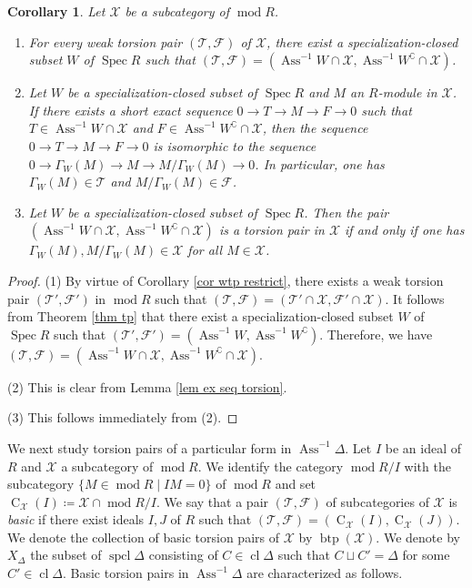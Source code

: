 \documentclass{amsart}
\newtheorem{cor}[thm]{Corollary}
\theoremstyle{definition}
\theoremstyle{remark}
\def\Ass{\operatorname{Ass}}
\def\btp{\operatorname{btp}}
\def\CC{\operatorname{C}}
\def\cl{\operatorname{cl}}
\def\F{\mathcal{F}}
\def\mod{\operatorname{mod}}
\def\spcl{\operatorname{spcl}}
\def\Spec{\operatorname{Spec}}
\def\T{\mathcal{T}}
\def\X{\mathcal{X}}
\begin{document}
\begin{cor}\label{cor cano seq}
Let $\X$ be a subcategory of $\mod R$.
\begin{enumerate}[\rm(1)]
\item
For every weak torsion pair $(\T,\F)$ of $\X$, there exist a specialization-closed subset $W$ of $\Spec R$ such that $(\T,\F)=(\Ass^{-1}W\cap\X,\Ass^{-1}W^\complement \cap\X)$.
\item 
Let $W$ be a specialization-closed subset of $\Spec R$ and $M$ an $R$-module in $\X$. If there exists a short exact sequence $0\to T\to M\to F\to0$ such that $T\in\Ass^{-1}W\cap\X$ and $F\in\Ass^{-1}W^\complement\cap\X$, then the sequence $0\to T\to M\to F\to0$ is isomorphic to the sequence $0\to\Gamma_W(M)\to M\to M/\Gamma_W(M)\to0$. In particular, one has $\Gamma_W(M)\in\T$ and $M/\Gamma_W(M)\in\F$.
\item 
Let $W$ be a specialization-closed subset of $\Spec R$. Then the pair $(\Ass^{-1}W\cap\X,\Ass^{-1}W^\complement \cap\X)$ is a torsion pair in $\X$ if and only if one has $\Gamma_W(M),M/\Gamma_W(M)\in\X$ for all $M\in\X$.
\end{enumerate}
\end{cor}

\begin{proof}
(1) By virtue of Corollary \ref{cor wtp restrict}, there exists a weak torsion pair $(\T',\F')$ in $\mod R$ such that $(\T,\F)=(\T'\cap\X,\F'\cap\X)$. It follows from Theorem \ref{thm tp} that there exist a specialization-closed subset $W$ of $\Spec R$ such that $(\T',\F')=(\Ass^{-1}W,\Ass^{-1}W^\complement )$. Therefore, we have $(\T,\F)=(\Ass^{-1}W\cap\X,\Ass^{-1}W^\complement \cap\X)$.

(2) This is clear from Lemma \ref{lem ex seq torsion}.

(3) This follows immediately from (2).
\end{proof}

We next study torsion pairs of a particular form in $\Ass^{-1}\Delta$. Let $I$ be an ideal of $R$ and $\X$ a subcategory of $\mod R$. We identify the category $\mod R/I$ with the subcategory $\{M\in\mod R\mid IM=0\}$ of $\mod R$ and set $\CC_\X(I)\coloneq\X\cap\mod R/I$. We say that a pair $(\T,\F)$ of subcategories of $\X$ is {\em basic} if there exist ideals $I,J$ of $R$ such that $(\T,\F)=(\CC_\X(I),\CC_\X(J))$. We denote the collection of basic torsion pairs of $\X$ by $\btp(\X)$. We denote by $X_\Delta$ the subset of $\spcl\Delta$ consisting of $C\in\cl\Delta$ such that $C\sqcup C'=\Delta$ for some $C'\in\cl\Delta$. Basic torsion pairs in $\Ass^{-1}\Delta$ are characterized as follows.
\end{document}
